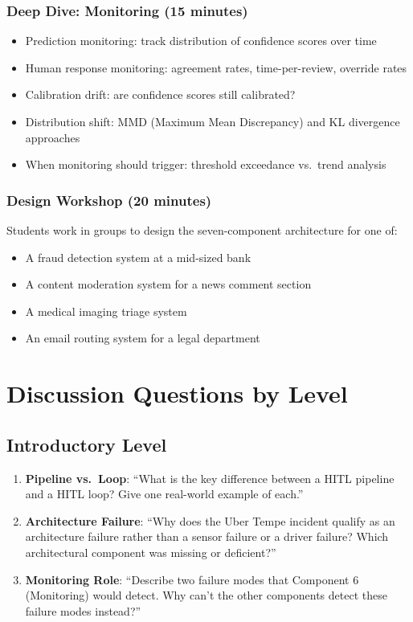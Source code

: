 \subsubsection{Deep Dive: Monitoring (15 minutes)}
\begin{itemize}
    \item Prediction monitoring: track distribution of confidence scores over time
    \item Human response monitoring: agreement rates, time-per-review, override rates
    \item Calibration drift: are confidence scores still calibrated?
    \item Distribution shift: MMD (Maximum Mean Discrepancy) and KL divergence approaches
    \item When monitoring should trigger: threshold exceedance vs.\ trend analysis
\end{itemize}

\subsubsection{Design Workshop (20 minutes)}
Students work in groups to design the seven-component architecture for one of:
\begin{itemize}
    \item A fraud detection system at a mid-sized bank
    \item A content moderation system for a news comment section
    \item A medical imaging triage system
    \item An email routing system for a legal department
\end{itemize}

\section{Discussion Questions by Level}

\subsection{Introductory Level}

\begin{enumerate}
    \item \textbf{Pipeline vs.\ Loop}: ``What is the key difference between a HITL pipeline and a HITL loop? Give one real-world example of each.''

    \item \textbf{Architecture Failure}: ``Why does the Uber Tempe incident qualify as an architecture failure rather than a sensor failure or a driver failure? Which architectural component was missing or deficient?''

    \item \textbf{Monitoring Role}: ``Describe two failure modes that Component 6 (Monitoring) would detect. Why can't the other components detect these failure modes instead?''
\end{enumerate}

